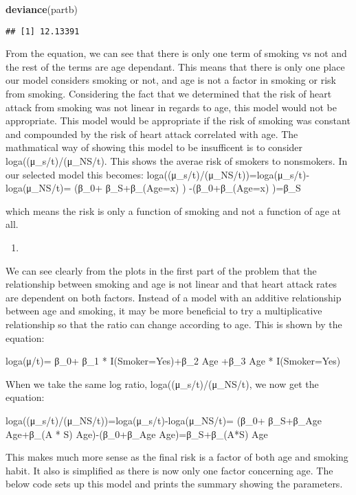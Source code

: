 \documentclass[
]{article}
\newenvironment{Shaded}{\begin{snugshade}}{\end{snugshade}}
\newcommand{\KeywordTok}[1]{\textcolor[rgb]{0.13,0.29,0.53}{\textbf{#1}}}
\newcommand{\NormalTok}[1]{#1}
\begin{document}
\begin{Shaded}
\begin{Highlighting}[]
\KeywordTok{deviance}\NormalTok{(partb)}
\end{Highlighting}
\end{Shaded}

\begin{verbatim}
## [1] 12.13391
\end{verbatim}

From the equation, we can see that there is only one term of smoking vs
not and the rest of the terms are age dependant. This means that there
is only one place our model considers smoking or not, and age is not a
factor in smoking or risk from smoking. Considering the fact that we
determined that the risk of heart attack from smoking was not linear in
regards to age, this model would not be appropriate. This model would be
appropriate if the risk of smoking was constant and compounded by the
risk of heart attack correlated with age. The mathmatical way of showing
this model to be insufficent is to consider loga((μ\_s/t)/(μ\_NS/t).
This shows the averae risk of smokers to nonsmokers. In our selected
model this becomes: loga((μ\_s/t)/(μ\_NS/t))=loga(μ\_s/t)-loga(μ\_NS/t)=
(β\_0+ β\_S+β\_(Age=x) ) -(β\_0+β\_(Age=x) )=β\_S

which means the risk is only a function of smoking and not a function of
age at all.

\begin{enumerate}
\def\labelenumi{\alph{enumi})}
\setcounter{enumi}{2}
\item
\end{enumerate}

We can see clearly from the plots in the first part of the problem that
the relationship between smoking and age is not linear and that heart
attack rates are dependent on both factors. Instead of a model with an
additive relationship between age and smoking, it may be more beneficial
to try a multiplicative relationship so that the ratio can change
according to age. This is shown by the equation:

loga(μ/t)= β\_0+ β\_1 * I(Smoker=Yes)+β\_2 Age +β\_3 Age * I(Smoker=Yes)

When we take the same log ratio, loga((μ\_s/t)/(μ\_NS/t), we now get the
equation:

loga((μ\_s/t)/(μ\_NS/t))=loga(μ\_s/t)-loga(μ\_NS/t)= (β\_0+ β\_S+β\_Age
Age+β\_(A * S) Age)-(β\_0+β\_Age Age)=β\_S+β\_(A*S) Age

This makes much more sense as the final risk is a factor of both age and
smoking habit. It also is simplified as there is now only one factor
concerning age. The below code sets up this model and prints the summary
showing the parameters.
\end{document}
